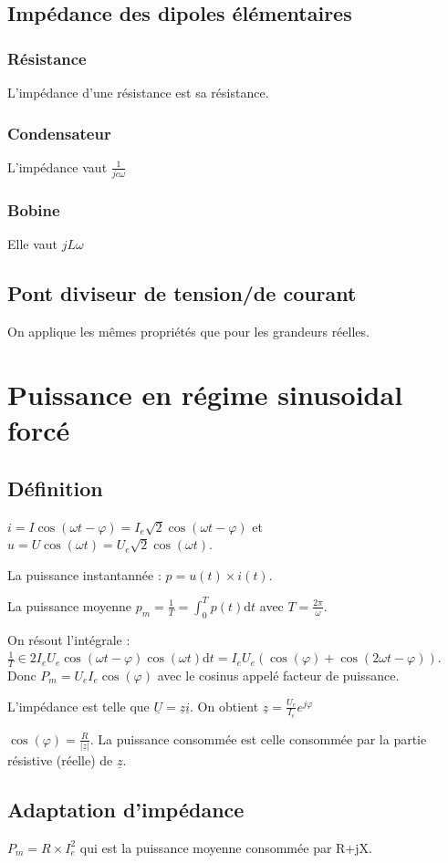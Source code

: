 \documentclass[french]{yLectureNote}
\newcommand{\dd}{\mathrm{d}}
\begin{document}
\subsection{Impédance des dipoles élémentaires}
\subsubsection{Résistance}
L'impédance d'une résistance est sa résistance.
\subsubsection{Condensateur}
L'impédance vaut \(\frac{1}{jc\omega}\)
\subsubsection{Bobine}
Elle vaut \(jL\omega\)
\subsection{Pont diviseur de tension/de courant}
On applique les m\^emes propriétés que pour les grandeurs réelles.
\section{Puissance en régime sinusoidal forcé}
\subsection{Définition}
\(i = I\cos(\omega t-\varphi) = I_e \sqrt{2} \cos(\omega t-\varphi)\) et \(u = U\cos(\omega t) = U_e \sqrt{2} \cos(\omega t)\).

La puissance instantannée : \(p = u(t)\times i(t)\).

La puissance moyenne \(p_m = \frac{1}{T} = \int^{T}_{0}p(t)\dd t\) avec \(T = \frac{2\pi}{\omega}\).

On résout l'intégrale : \(\frac{1}{T}\in 2I_eU_e \cos(\omega t-\varphi)\cos(\omega t)\dd t = I_eU_e(\cos(\varphi)+ \cos(2\omega t-\varphi))\). Donc \(P_m = U_eI_e \cos(\varphi)\) avec le cosinus appelé facteur de puissance.

L'impédance est telle que \(\underline{U} = \underline{z}\underline{i}\). On obtient \(\underline{z} = \frac{U_e}{I_e} e^{j\varphi}\)

\(\cos(\varphi) = \frac{R}{|\underline{z}|}\). La puissance consommée est celle consommée par la partie résistive (réelle) de \(\underline{z}\).

\subsection{Adaptation d'impédance}
\(P_m = R\times I_e^2\) qui est la puissance moyenne consommée par R+jX.
\end{document}

